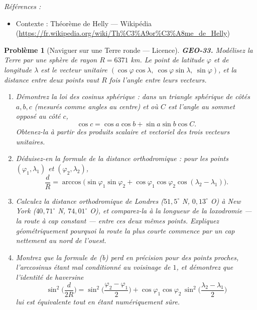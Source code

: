\documentclass[11pt]{article}
\newtheorem{problem}{Problème}
\newenvironment{refs}{\par\small\noindent\emph{Références :}\begin{itemize}\setlength\itemsep{0pt}}{\end{itemize}\normalsize}
\begin{document}
\begin{refs}
\item Contexte : Théorème de Helly --- Wikipédia (\url{https://fr.wikipedia.org/wiki/Th%C3%A9or%C3%A8me_de_Helly})
\end{refs}

\bigskip

\begin{problem}[{Naviguer sur une Terre ronde --- Licence}]
\textbf{GEO-33.} Modélisez la Terre par une sphère de rayon $ R = 6371 $ km. Le point de
latitude $ \varphi $ et de longitude $ \lambda $ est le vecteur unitaire
$ (\cos\varphi\cos\lambda, \ \cos\varphi\sin\lambda, \ \sin\varphi) $, et la distance entre deux
points vaut $ R $ fois l'angle entre leurs vecteurs.
\begin{enumerate}
\item[(a)] Démontrez la loi des cosinus sphérique : dans un triangle sphérique de côtés $ a, b, c $
(mesurés comme angles au centre) et où $ C $ est l'angle au sommet opposé au côté $ c $,
\[ \cos c = \cos a \cos b + \sin a \sin b \cos C . \]
Obtenez-la à partir des produits scalaire et vectoriel des trois vecteurs unitaires.
\item[(b)] Déduisez-en la formule de la distance orthodromique : pour les points $ (\varphi_1, \lambda_1) $
et $ (\varphi_2, \lambda_2) $,
\[ \frac{d}{R} = \arccos\Big( \sin\varphi_1 \sin\varphi_2 + \cos\varphi_1 \cos\varphi_2
\cos(\lambda_2 - \lambda_1) \Big) . \]
\item[(c)] Calculez la distance orthodromique de Londres ($ 51{,}5^\circ $ N, $ 0{,}13^\circ $ O) à
New York ($ 40{,}71^\circ $ N, $ 74{,}01^\circ $ O), et comparez-la à la longueur de la
\textit{loxodromie} --- la route à cap constant --- entre ces deux mêmes points. Expliquez
géométriquement pourquoi la route la plus courte commence par un cap nettement au nord de
l'ouest.
\item[(d)] Montrez que la formule de (b) perd en précision pour des points proches, l'arccosinus étant
mal conditionné au voisinage de $ 1 $, et démontrez que l'identité de haversine
\[ \sin^2\!\Big(\frac{d}{2R}\Big) = \sin^2\!\Big(\frac{\varphi_2 - \varphi_1}{2}\Big)
+ \cos\varphi_1 \cos\varphi_2 \, \sin^2\!\Big(\frac{\lambda_2 - \lambda_1}{2}\Big) \]
lui est équivalente tout en étant numériquement sûre.
\end{enumerate}

\end{problem}
\end{document}
